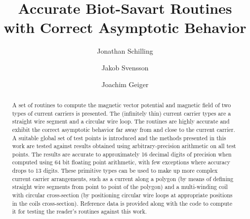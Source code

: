 \documentclass[preprint,12pt]{elsarticle}
\begin{document}
\begin{frontmatter}



\title{Accurate Biot-Savart Routines with Correct Asymptotic Behavior}


\author[a]{Jonathan Schilling}
\author[a]{Jakob Svensson}
\author[a]{Joachim Geiger}

\address[a]{Max-Planck-Institute for Plasma Physics, Wendelsteinstrasse 1, 17489 Greifswald, Germany}

\begin{abstract}
A set of routines to compute the magnetic vector potential and magnetic field of two types of current carriers is presented.
The (infinitely thin) current carrier types are a straight wire segment and a circular wire loop.
The routines are highly accurate and exhibit the correct asymptotic behavior far away from and close to the current carrier.
A suitable global set of test points is introduced and the methods presented in this work
are tested against results obtained using arbitrary-precision arithmetic on all test points.
The results are accurate to approximately 16 decimal digits of precision when computed using 64 bit floating point arithmetic,
with few exceptions where accuracy drops to 13 digits.
These primitive types can be used to make up more complex current carrier arrangements,
such as a current along a polygon (by means of defining straight wire segments from point to point of the polygon)
and a multi-winding coil with circular cross-section (by positioning circular wire loops at appropriate positions in the coils cross-section).
Reference data is provided along with the code to compute it
for testing the reader's routines against this work.
\end{abstract}


\end{frontmatter}
\end{document}

